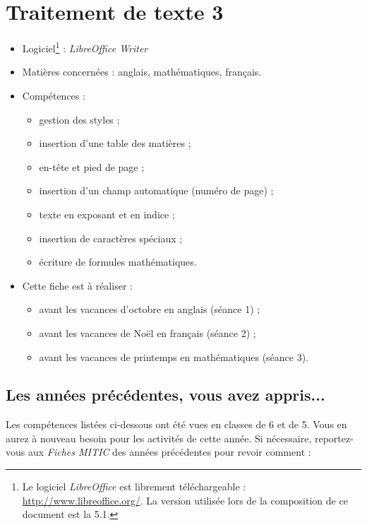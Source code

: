 \chapter{Traitement de texte 3}  


{\footnotesize
\begin{itemize}
\item Logiciel\footnote{Le logiciel \emph{LibreOffice} est librement téléchargeable : \url{http://www.libreoffice.org/}. La version utilisée lors de la composition de ce document est la 5.1.} : \emph{LibreOffice Writer} 
\item Matières concernées : anglais, mathématiques, français.
\item Compétences : 
        \begin{itemize}
        \item gestion des styles ;
	\item insertion d'une table des matières ;
	\item en-tête et pied de page ;
	\item insertion d'un champ automatique (numéro de page) ;
	\item texte en exposant et en indice ;
	\item insertion de caractères spéciaux ; 
	\item écriture de formules mathématiques.
        \end{itemize}
\item Cette fiche est à réaliser :
        \begin{itemize}
        \item avant les vacances d'octobre en anglais (séance 1) ;
	\item avant les vacances de Noël en français (séance 2) ;
        \item avant les vacances de printemps en mathématiques (séance 3).
         
        \end{itemize}
\end{itemize}
}%




\section*{Les années précédentes, vous avez appris...}

Les compétences listées ci-dessous ont été vues en classes de 6 et de 5. Vous en aurez à nouveau besoin pour les activités de cette année. Si nécessaire, reportez-vous aux \emph{Fiches MITIC} des années précédentes pour revoir comment :  

